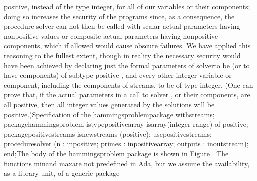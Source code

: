 \tyxffmxmono[]positive\tyxffmxendmono[], instead of the type %
\tyxffmxmono[]integer\tyxffmxendmono[], for all of our variables or
their components; doing so increases the security of the programs
since, as a consequence, the procedure \tyxffmxmono[]solver%
\tyxffmxendmono[] can not then be called with scalar actual parameters
having nonpositive values or composite actual parameters having nonpositive
components, which if allowed would cause obscure failures. We have
applied this reasoning to the fullest extent, though in reality the
necessary security would have been achieved by declaring just the
formal parameters of \tyxffmxmono[]solver\tyxffmxendmono[] to be (or
to have components) of subtype \tyxffmxmono[]positive%
\tyxffmxendmono[], and every other integer variable or component,
including the components of streams, to be of type %
\tyxffmxmono[]integer\tyxffmxendmono[]. (One can prove that, if the
actual parameters in a call to \tyxffmxmono[]solver%
\tyxffmxendmono[], or their components, are all positive, then all
integer values generated by the solutions \txtxemph[]will%
\txtxendemph[] be positive.)\NtEndntpar[]\NtEndfoot[]
\FgBlock[]
\Parbox[]
Specification of the
\tyxffmxmono[]hammings\Symuns[]problem\tyxffmxendmono[] package%
\FgEndcap[]
\Comp[]\tyxtstxbf[]with\tyxtstxendbf[] streams;
\tyxtstxbf[]package\tyxtstxendbf[] hammings\Symuns[]problem %
\tyxtstxbf[]is\tyxtstxendbf[]
   \tyxtstxbf[]type\tyxtstxendbf[] positive\Symuns[]array %
\tyxtstxbf[]is\tyxtstxendbf[] \tyxtstxbf[]array\tyxtstxendbf[] (integer %
\tyxtstxbf[]range\tyxtstxendbf[] \Symlt[]\Symgt[]) \tyxtstxbf[]of%
\tyxtstxendbf[] positive;
   \tyxtstxbf[]package\tyxtstxendbf[] positive\Symuns[]streams %
\tyxtstxbf[]is\tyxtstxendbf[] \tyxtstxbf[]new\tyxtstxendbf[] streams (positive);
   \tyxtstxbf[]use\tyxtstxendbf[]     positive\Symuns[]streams;
   \tyxtstxbf[]procedure\tyxtstxendbf[] solver (n       : %
\tyxtstxbf[]in\tyxtstxendbf[]     positive;
                     primes  : \tyxtstxbf[]in\tyxtstxendbf[]     positive\Symuns[]array;
                     outputs : \tyxtstxbf[]in\tyxtstxendbf[] %
\tyxtstxbf[]out\tyxtstxendbf[] stream);
\tyxtstxbf[]end\tyxtstxendbf[];\Endcomp[]
\EndParbox[]
\FgEndblock[]
\Endpara[]
\Para[]The body of the \tyxffmxmono[]hammings\Symuns[]problem%
\tyxffmxendmono[] package is shown in Figure .
The functions \tyxffmxmono[]min\tyxffmxendmono[] and %
\tyxffmxmono[]max\tyxffmxendmono[] are not predefined in Ada, but
we assume the availability, as a library unit, of a generic package
